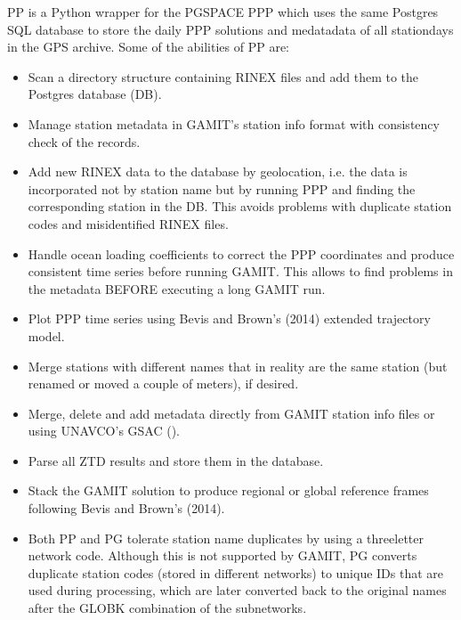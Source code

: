 \documentclass[letterpaper,10pt,english]{sphinxmanual}
\begin{document}
\sphinxAtStartPar
PP is a Python wrapper for the PGSPACE PPP which uses the same Postgres SQL database to store the daily PPP solutions and medatadata of all station\sphinxhyphen{}days in the GPS archive. Some of the abilities of PP are:
\begin{itemize}
\item {} 
\sphinxAtStartPar
Scan a directory structure containing RINEX files and add them to the Postgres database (DB).

\item {} 
\sphinxAtStartPar
Manage station metadata in GAMIT’s station info format with consistency check of the records.

\item {} 
\sphinxAtStartPar
Add new RINEX data to the database by geolocation, i.e. the data is incorporated not by station name but by running PPP and finding the corresponding station in the DB. This avoids problems with duplicate station codes and misidentified RINEX files.

\item {} 
\sphinxAtStartPar
Handle ocean loading coefficients to correct the PPP coordinates and produce consistent time series before running GAMIT. This allows to find problems in the metadata BEFORE executing a long GAMIT run.

\item {} 
\sphinxAtStartPar
Plot PPP time series using Bevis and Brown’s (2014) extended trajectory model.

\item {} 
\sphinxAtStartPar
Merge stations with different names that in reality are the same station (but renamed or moved a couple of meters), if desired.

\item {} 
\sphinxAtStartPar
Merge, delete and add metadata directly from GAMIT station info files or using UNAVCO’s GSAC ().

\item {} 
\sphinxAtStartPar
Parse all ZTD results and store them in the database.

\item {} 
\sphinxAtStartPar
Stack the GAMIT solution to produce regional or global reference frames following Bevis and Brown’s (2014).

\item {} 
\sphinxAtStartPar
Both PP and PG tolerate station name duplicates by using a three\sphinxhyphen{}letter network code. Although this is not supported by GAMIT, PG converts duplicate station codes (stored in different networks) to unique IDs that are used during processing, which are later converted back to the original names after the GLOBK combination of the subnetworks.


\end{itemize}
\end{document}
